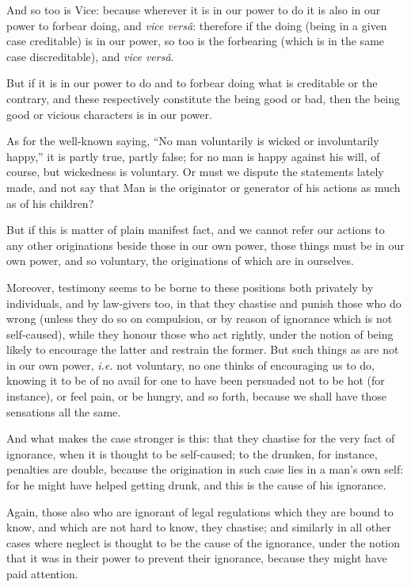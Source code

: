 And so too is Vice: because wherever it is in our power to do it is also in our
power to forbear doing, and \emph{vice versâ}: therefore if the doing (being in
a given case creditable) is in our power, so too is the forbearing (which is in
the same case discreditable), and \emph{vice versâ}.

But if it is in our power to do and to forbear doing what is creditable or the
contrary, and these respectively constitute the being good or bad, then the
being good or vicious characters is in our power.

As for the well-known saying, “No man voluntarily is wicked or
involuntarily happy,” it is partly true, partly false; for no man is
happy against his will, of course, but wickedness is voluntary. Or must we
dispute the statements lately made, and not say that Man is the originator or
generator of his actions as much as of his children?

But if this is matter of plain manifest fact, and we cannot refer our actions
to any other originations beside those in our own power, those things must be
in our own power, and so voluntary, the originations of which are in ourselves.

Moreover, testimony seems to be borne to these positions both privately by
individuals, and by law-givers too, in that they chastise and punish those who
do wrong (unless they do so on compulsion, or by reason of ignorance which is
not self-caused), while they honour those who act rightly, under the notion of
being likely to encourage the latter and restrain the former. But such things
as are not in our own power, \emph{i.e.} not voluntary, no one thinks of
encouraging us to do, knowing it to be of no avail for one to have been
persuaded not to be hot (for instance), or feel pain, or be hungry, and so
forth, because we shall have those sensations all the same.

And what makes the case stronger is this: that they chastise for the very fact
of ignorance, when it is thought to be self-caused; to the drunken, for
instance, penalties are double, because the origination in such case lies in a
man’s own self: for he might have helped getting drunk, and this is the
cause of his ignorance.

Again, those also who are ignorant of legal regulations which they are bound to
know, and which are not hard to know, they chastise; and similarly in all other
cases where neglect is thought to be the cause of the ignorance, under the
notion that it was in their power to prevent their ignorance, because they
might have paid attention.

